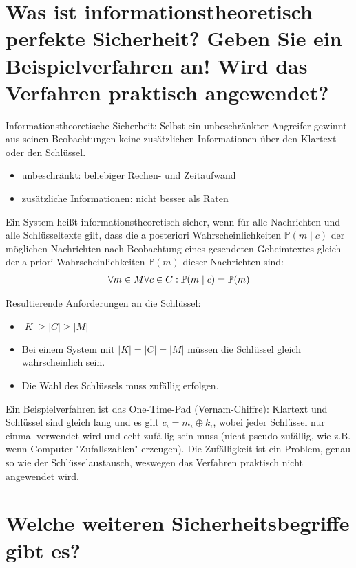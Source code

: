 \documentclass{article}
\begin{document}
	\section*{Was ist informationstheoretisch perfekte Sicherheit? Geben Sie ein Beispielverfahren an! Wird das Verfahren praktisch angewendet?}
	
	Informationstheoretische Sicherheit: Selbst ein unbeschränkter Angreifer gewinnt aus seinen Beobachtungen keine zusätzlichen Informationen über den Klartext oder den Schlüssel.
	\begin{itemize}
		\item unbeschränkt: beliebiger Rechen- und Zeitaufwand
		\item zusätzliche Informationen: nicht besser als Raten
	\end{itemize}

	Ein System heißt informationstheoretisch sicher, wenn für alle Nachrichten und alle Schlüsseltexte gilt, dass die a posteriori Wahrscheinlichkeiten $\mathbb{P}(m\mid c)$ der möglichen Nachrichten nach Beobachtung eines gesendeten Geheimtextes gleich der a priori Wahrscheinlichkeiten $\mathbb{P}(m)$ dieser Nachrichten sind:
	\begin{align}
		\forall m\in M\forall c\in C: \mathbb{P}(m\mid c) = \mathbb{P}(m) \notag
	\end{align}

	Resultierende Anforderungen an die Schlüssel:
	\begin{itemize}
		\item $\vert K\vert \ge \vert C\vert \ge \vert M\vert$
		\item Bei einem System mit $\vert K\vert = \vert C\vert = \vert M\vert$ müssen die Schlüssel gleich wahrscheinlich sein.
		\item Die Wahl des Schlüssels muss zufällig erfolgen.
	\end{itemize}

	Ein Beispielverfahren ist das One-Time-Pad (Vernam-Chiffre): Klartext und Schlüssel sind gleich lang und es gilt $c_i = m_i \oplus k_i$, wobei jeder Schlüssel nur einmal verwendet wird und echt zufällig sein muss (nicht pseudo-zufällig, wie z.B. wenn Computer "Zufallszahlen" erzeugen). Die Zufälligkeit ist ein Problem, genau so wie der Schlüsselaustausch, weswegen das Verfahren praktisch nicht angewendet wird.
	
	\section*{Welche weiteren Sicherheitsbegriffe gibt es?}
	
\end{document}
